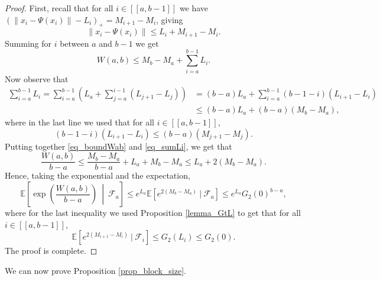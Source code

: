 \documentclass[a4paper, 11pt]{article}
\theoremstyle{plain}
\theoremstyle{definition}
\newcommand{\E}{\mathbb{E}}
\newcommand{\range}[2]{[\![#1,#2]\!]}
\numberwithin{equation}{section}
\begin{document}
\begin{proof}
    First, recall that for all $i\in\range{a}{b-1}$ we have $(\|x_i-\Psi(x_i)\|-L_i)_+=M_{i+1}-M_i$, giving
        \[\|x_i-\Psi(x_i)\|\leq L_i+M_{i+1}-M_i.\]
    Summing for $i$ between $a$ and $b-1$ we get
        \begin{equation}
            \label{eq_boundWab}
            W(a,b)\leq M_b-M_a+\sum_{i=a}^{b-1}L_i.
        \end{equation}
    Now observe that
        \begin{equation}
            \label{eq_sumLi}
            \begin{split}
                \sum_{i=a}^{b-1}L_i=\sum_{i=a}^{b-1}\left(L_a+\sum_{j=a}^{i-1}(L_{j+1}-L_j)\right)
                &=(b-a)L_a+\sum_{i=a}^{b-1}(b-1-i)(L_{i+1}-L_i)\\
                &\leq (b-a)L_a+(b-a)(M_b-M_a),
            \end{split}
        \end{equation}
    where in the last line we used that for all $i\in\range{a}{b-1}$,
        \[(b-1-i)(L_{i+1}-L_i)\leq(b-a)(M_{j+1}-M_j).\]
    Putting together \eqref{eq_boundWab} and \eqref{eq_sumLi}, we get that
        \[\frac{W(a, b)}{b-a}\leq \frac{M_b-M_a}{b-a}+L_a+M_b-M_a\leq L_a+2(M_b-M_a).\]
    Hence, taking the exponential and the expectation,
        \begin{equation*}
            \E\left[\exp\left(\frac{W(a, b)}{b-a}\right)~\middle\vert~\mathcal F_a\right]\leq e^{L_a}\E[e^{2(M_b-M_a)}~\vert~\mathcal F_a]\leq e^{L_a}G_2(0)^{b-a},
        \end{equation*}
    where for the last inequality we used Proposition \ref{lemma_GtL} to get that for all $i\in\range{a}{b-1}$, 
        \[\E[e^{2(M_{i+1}-M_i)}~|~\mathcal F_i]\leq G_2(L_i)\leq G_2(0).\]
    The proof is complete.
\end{proof}


We can now prove Proposition \ref{prop_block_size}.
\end{document}
